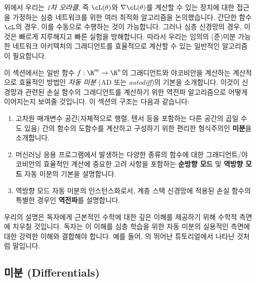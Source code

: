\documentclass[../../book-main_ko.tex]{subfiles}
\begin{document}
위에서 우리는 \textit{1차 오라클}, 즉 \(\cL(\theta)\)와 \(\nabla \cL(\theta)\)를 계산할 수 있는 장치에 대한 접근을 가정하는 심층 네트워크를 위한 여러 최적화 알고리즘을 논의했습니다. 간단한 함수 \(\cL\)의 경우, 이를 수동으로 수행하는 것이 가능합니다. 그러나 심층 신경망의 경우, 이것은 빠르게 지루해지고 빠른 실험을 방해합니다. 따라서 우리는 임의의 (준)미분 가능한 네트워크 아키텍처의 그래디언트를 효율적으로 계산할 수 있는 일반적인 알고리즘이 필요합니다.

이 섹션에서는 일반 함수 \(f: \R^{m} \to \R^{n}\)의 그래디언트와 야코비안을 계산하는 계산적으로 효율적인 방법인 \textit{자동 미분} (AD 또는 \textit{autodiff})의 기본을 소개합니다. 이것이 신경망과 관련된 손실 함수의 그래디언트를 계산하기 위한 역전파 알고리즘으로 어떻게 이어지는지 보여줄 것입니다. 이 섹션의 구조는 다음과 같습니다:
\begin{enumerate}
    \item 고차원 매개변수 공간(자체적으로 행렬, 텐서 등을 포함하는 다른 공간의 곱일 수도 있음) 간의 함수의 도함수를 계산하고 구성하기 위한 편리한 형식주의인 \textbf{미분}을 소개합니다.
    \item 머신러닝 응용 프로그램에서 발생하는 다양한 종류의 함수에 대한 그래디언트/야코비안의 효율적인 계산에 중요한 고려 사항을 포함하는 \textbf{순방향 모드} 및 \textbf{역방향 모드} 자동 미분의 기본을 설명합니다.
    \item 역방향 모드 자동 미분의 인스턴스화로서, 계층 스택 신경망에 적용된 손실 함수의 특별한 경우인 \textbf{역전파}를 설명합니다.
\end{enumerate}

우리의 설명은 독자에게 근본적인 수학에 대한 깊은 이해를 제공하기 위해 수학적 측면에 치우칠 것입니다. 독자는 이 이해를 심층 학습을 위한 자동 미분의 실용적인 측면에 대한 강력한 이해와 결합해야 합니다. 예를 들어, \textcite{karpathy-micrograd}의 뛰어난 튜토리얼에서 나타난 것처럼 말입니다.

\subsection{미분 (Differentials)}
\end{document}
